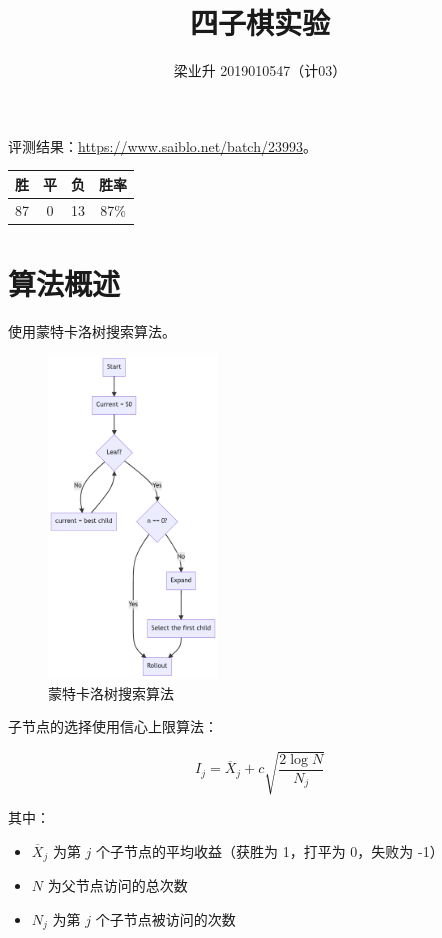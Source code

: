 \documentclass[a4paper]{article}
\begin{document}
\title{四子棋实验}
\author{梁业升 2019010547（计03）}

\maketitle

评测结果：\hyperlink{https://www.saiblo.net/batch/23993}{https://www.saiblo.net/batch/23993}。

\begin{tabular}{c c c c}
    胜 & 平 & 负 & 胜率 \\
    \hline
    87 & 0 & 13 & 87\%

\end{tabular}

\section{算法概述}\label{sec:algorithm}

使用蒙特卡洛树搜索算法。

\begin{figure}[H]
\centering
    \includegraphics[width=0.4\textwidth]{assets/mcts.png}
    \caption{蒙特卡洛树搜索算法}
\end{figure}

子节点的选择使用信心上限算法：

$$I_j=\overline{X}_j+c\sqrt{\frac{2\log N}{N_j}}$$

其中：

\begin{itemize}
    \item $\overline{X}_j$ 为第 $j$ 个子节点的平均收益（获胜为 1，打平为 0，失败为 -1）
    \item $N$ 为父节点访问的总次数
    \item $N_j$ 为第 $j$ 个子节点被访问的次数
\end{itemize}
\end{document}
